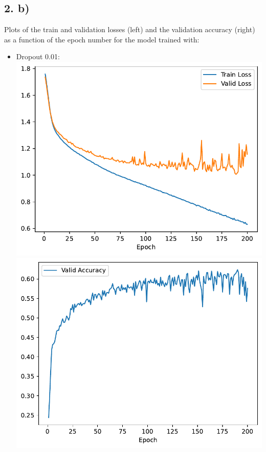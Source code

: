 \documentclass[12pt,a4paper]{article}
\begin{document}
    \subsection{2. b)}
        Plots of the train and validation losses (left) and the validation accuracy (right) as a function of the epoch number for the model trained with:
        \begin{itemize}
            \item Dropout 0.01: \\
                \includegraphics[width=\imagewidth]{q2/q2_2b_dropout_0.01-training-loss.pdf}
                \includegraphics[width=\imagewidth]{q2/q2_2b_dropout_0.01-validation-accuracy.pdf} \\

\end{itemize}
\end{document}

